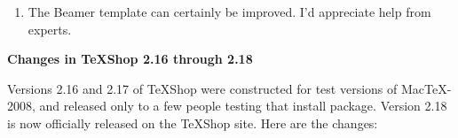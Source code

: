 \documentclass[11pt, oneside]{amsart}
\begin{document}
\begin{enumerate}
TeXShop 2.15 has a new mechanism for such users. A hidden preference allows users to add extensions to the list of legal extensions which activate the Typeset button. For example, the command
\begin{verbatim}
     defaults TeXShop OtherTeXExtensions -array-add "htx" 
\end{verbatim}
adds ``.htx'' to the list. To clear the list and start over with the built-in defaults, use
\begin{verbatim}
     defaults TeXShop OtherTeXExtensions -array
\end{verbatim}
Actually, ``.htx'' and ``.sk'' are now built-in, so these users do not need the new mechanism. But it is available for future users.

\item The Beamer template can certainly be improved. I'd appreciate help from experts.

\end{enumerate}

{\bf Changes in TeXShop 2.16 through 2.18}

Versions 2.16 and 2.17 of TeXShop were constructed for  test versions of  MacTeX-2008, and released only to a few people testing that install package. Version 2.18 is now officially released on the TeXShop site.
Here are the changes:
\end{document}
